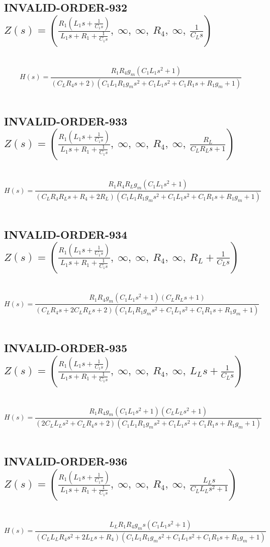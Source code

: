 \documentclass{article}
\begin{document}
\subsection{INVALID-ORDER-932 $Z(s) = \left( \frac{R_{1} \left(L_{1} s + \frac{1}{C_{1} s}\right)}{L_{1} s + R_{1} + \frac{1}{C_{1} s}}, \  \infty, \  \infty, \  R_{4}, \  \infty, \  \frac{1}{C_{L} s}\right)$ } \ 
\textbf{\[H(s) = \frac{R_{1} R_{4} g_{m} \left(C_{1} L_{1} s^{2} + 1\right)}{\left(C_{L} R_{4} s + 2\right) \left(C_{1} L_{1} R_{1} g_{m} s^{2} + C_{1} L_{1} s^{2} + C_{1} R_{1} s + R_{1} g_{m} + 1\right)}\] } \ 
\subsection{INVALID-ORDER-933 $Z(s) = \left( \frac{R_{1} \left(L_{1} s + \frac{1}{C_{1} s}\right)}{L_{1} s + R_{1} + \frac{1}{C_{1} s}}, \  \infty, \  \infty, \  R_{4}, \  \infty, \  \frac{R_{L}}{C_{L} R_{L} s + 1}\right)$ } \ 
\textbf{\[H(s) = \frac{R_{1} R_{4} R_{L} g_{m} \left(C_{1} L_{1} s^{2} + 1\right)}{\left(C_{L} R_{4} R_{L} s + R_{4} + 2 R_{L}\right) \left(C_{1} L_{1} R_{1} g_{m} s^{2} + C_{1} L_{1} s^{2} + C_{1} R_{1} s + R_{1} g_{m} + 1\right)}\] } \ 
\subsection{INVALID-ORDER-934 $Z(s) = \left( \frac{R_{1} \left(L_{1} s + \frac{1}{C_{1} s}\right)}{L_{1} s + R_{1} + \frac{1}{C_{1} s}}, \  \infty, \  \infty, \  R_{4}, \  \infty, \  R_{L} + \frac{1}{C_{L} s}\right)$ } \ 
\textbf{\[H(s) = \frac{R_{1} R_{4} g_{m} \left(C_{1} L_{1} s^{2} + 1\right) \left(C_{L} R_{L} s + 1\right)}{\left(C_{L} R_{4} s + 2 C_{L} R_{L} s + 2\right) \left(C_{1} L_{1} R_{1} g_{m} s^{2} + C_{1} L_{1} s^{2} + C_{1} R_{1} s + R_{1} g_{m} + 1\right)}\] } \ 
\subsection{INVALID-ORDER-935 $Z(s) = \left( \frac{R_{1} \left(L_{1} s + \frac{1}{C_{1} s}\right)}{L_{1} s + R_{1} + \frac{1}{C_{1} s}}, \  \infty, \  \infty, \  R_{4}, \  \infty, \  L_{L} s + \frac{1}{C_{L} s}\right)$ } \ 
\textbf{\[H(s) = \frac{R_{1} R_{4} g_{m} \left(C_{1} L_{1} s^{2} + 1\right) \left(C_{L} L_{L} s^{2} + 1\right)}{\left(2 C_{L} L_{L} s^{2} + C_{L} R_{4} s + 2\right) \left(C_{1} L_{1} R_{1} g_{m} s^{2} + C_{1} L_{1} s^{2} + C_{1} R_{1} s + R_{1} g_{m} + 1\right)}\] } \ 
\subsection{INVALID-ORDER-936 $Z(s) = \left( \frac{R_{1} \left(L_{1} s + \frac{1}{C_{1} s}\right)}{L_{1} s + R_{1} + \frac{1}{C_{1} s}}, \  \infty, \  \infty, \  R_{4}, \  \infty, \  \frac{L_{L} s}{C_{L} L_{L} s^{2} + 1}\right)$ } \ 
\textbf{\[H(s) = \frac{L_{L} R_{1} R_{4} g_{m} s \left(C_{1} L_{1} s^{2} + 1\right)}{\left(C_{L} L_{L} R_{4} s^{2} + 2 L_{L} s + R_{4}\right) \left(C_{1} L_{1} R_{1} g_{m} s^{2} + C_{1} L_{1} s^{2} + C_{1} R_{1} s + R_{1} g_{m} + 1\right)}\] } \ 
\end{document}
